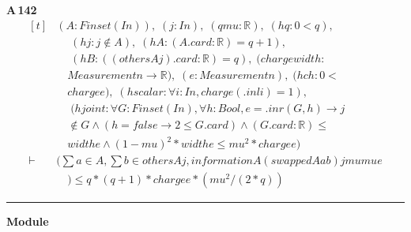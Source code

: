 \noindent\textbf{A\,142}\quad{}
{\footnotesize\[ \begin{aligned}[t]
&(\mathit{A} : \mathit{Finset} (\mathit{I} \mathit{n})),\; (\mathit{j} : \mathit{I} \mathit{n}),\; (\mathit{q} \mathit{mu} : \mathbb{R} ),\; (\mathit{hq} : 0<\mathit{q}),\\
&\quad \; (\mathit{hj} : \mathit{j} \notin \mathit{A}),\; (\mathit{hA} : (\mathit{A}.\mathit{card}:\mathbb{R} )=\mathit{q}+1),\\
&\quad \; (\mathit{hB} : ((\mathit{others} \mathit{A} \mathit{j}).\mathit{card}:\mathbb{R} )=\mathit{q}),\; (\mathit{charge} \mathit{width} :\\
&\quad \mathit{Measurement} \mathit{n} \to \mathbb{R} ),\; (\mathit{e} : \mathit{Measurement} \mathit{n}),\; (\mathit{hch} : 0 <\\
&\quad \mathit{charge} \mathit{e}),\; (\mathit{hscalar} : \forall \mathit{i} : \mathit{I} \mathit{n}, \mathit{charge} (.\mathit{inl} \mathit{i}) = 1),\\
&\quad \; (\mathit{hjoint} : \forall \mathit{G} : \mathit{Finset} (\mathit{I} \mathit{n}), \forall \mathit{h} : \mathit{Bool}, \mathit{e} = .\mathit{inr} (\mathit{G},\mathit{h}) \to \mathit{j}\\
&\quad \notin \mathit{G} \wedge (\mathit{h}=\mathit{false} \to 2 \leq \mathit{G}.\mathit{card}) \wedge (\mathit{G}.\mathit{card}:\mathbb{R} ) \leq\\
&\quad \mathit{width} \mathit{e} \wedge (1-\mathit{mu})^{2}*\mathit{width} \mathit{e} \leq \mathit{mu}^{2}*\mathit{charge} \mathit{e})\\
\vdash\;&(\textstyle\sum \mathit{a} \in \mathit{A}, \textstyle\sum \mathit{b} \in \mathit{others} \mathit{A} \mathit{j}, \mathit{information} \mathit{A} (\mathit{swapped} \mathit{A} \mathit{a} \mathit{b}) \mathit{j} \mathit{mu} \mathit{mu} \mathit{e}\\
&\quad ) \leq \mathit{q}*(\mathit{q}+1)*\mathit{charge} \mathit{e}*(\mathit{mu}^{2}/(2*\mathit{q}))
\end{aligned} \]}

\vspace{4pt}\noindent\rule{\columnwidth}{0.4pt}\par\vspace{2pt}
\noindent\textbf{Module }\par\vspace{3pt}

